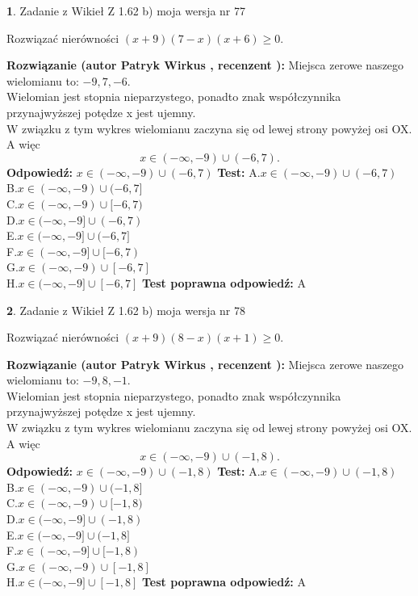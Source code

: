 \documentclass[12pt, a4paper]{article}
\theoremstyle{definition} %
\newtheorem{zad}{}
\newcommand{\zadStart}[1]{\begin{zad}#1\newline}
\newcommand{\zadStop}{\end{zad}}
\newcommand{\rozwStart}[2]{\noindent \textbf{Rozwiązanie (autor #1 , recenzent #2): }\newline}
\newcommand{\rozwStop}{\newline}
\newcommand{\odpStart}{\noindent \textbf{Odpowiedź:}\newline}
\newcommand{\odpStop}{\newline}
\newcommand{\testStart}{\noindent \textbf{Test:}\newline}
\newcommand{\testStop}{\newline}
\newcommand{\kluczStart}{\noindent \textbf{Test poprawna odpowiedź:}\newline}
\newcommand{\kluczStop}{\newline}
\begin{document}
\zadStart{Zadanie z Wikieł Z 1.62 b) moja wersja nr 77}

Rozwiązać nierówności $(x+9)(7-x)(x+6)\ge0$.
\zadStop
\rozwStart{Patryk Wirkus}{}
Miejsca zerowe naszego wielomianu to: $-9, 7, -6$.\\
Wielomian jest stopnia nieparzystego, ponadto znak współczynnika przy\linebreak najwyższej potędze x jest ujemny.\\ W związku z tym wykres wielomianu zaczyna się od lewej strony powyżej osi OX. A więc $$x \in (-\infty,-9) \cup (-6,7).$$
\rozwStop
\odpStart
$x \in (-\infty,-9) \cup (-6,7)$
\odpStop
\testStart
A.$x \in (-\infty,-9) \cup (-6,7)$\\
B.$x \in (-\infty,-9) \cup (-6,7]$\\
C.$x \in (-\infty,-9) \cup [-6,7)$\\
D.$x \in (-\infty,-9] \cup (-6,7)$\\
E.$x \in (-\infty,-9] \cup (-6,7]$\\
F.$x \in (-\infty,-9] \cup [-6,7)$\\
G.$x \in (-\infty,-9) \cup [-6,7]$\\
H.$x \in (-\infty,-9] \cup [-6,7]$
\testStop
\kluczStart
A
\kluczStop



\zadStart{Zadanie z Wikieł Z 1.62 b) moja wersja nr 78}

Rozwiązać nierówności $(x+9)(8-x)(x+1)\ge0$.
\zadStop
\rozwStart{Patryk Wirkus}{}
Miejsca zerowe naszego wielomianu to: $-9, 8, -1$.\\
Wielomian jest stopnia nieparzystego, ponadto znak współczynnika przy\linebreak najwyższej potędze x jest ujemny.\\ W związku z tym wykres wielomianu zaczyna się od lewej strony powyżej osi OX. A więc $$x \in (-\infty,-9) \cup (-1,8).$$
\rozwStop
\odpStart
$x \in (-\infty,-9) \cup (-1,8)$
\odpStop
\testStart
A.$x \in (-\infty,-9) \cup (-1,8)$\\
B.$x \in (-\infty,-9) \cup (-1,8]$\\
C.$x \in (-\infty,-9) \cup [-1,8)$\\
D.$x \in (-\infty,-9] \cup (-1,8)$\\
E.$x \in (-\infty,-9] \cup (-1,8]$\\
F.$x \in (-\infty,-9] \cup [-1,8)$\\
G.$x \in (-\infty,-9) \cup [-1,8]$\\
H.$x \in (-\infty,-9] \cup [-1,8]$
\testStop
\kluczStart
A
\kluczStop
\end{document}
